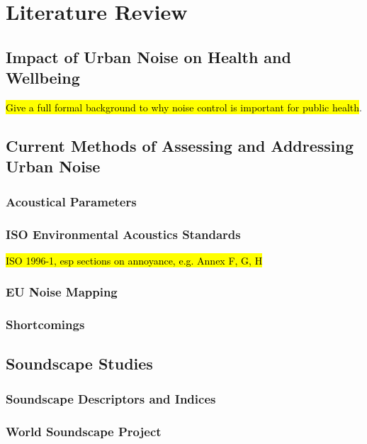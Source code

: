 \chapter{Literature Review}
\label{ch:lit}

\section{Impact of Urban Noise on Health and Wellbeing}

  \hl{Give a full formal background to why noise control is important for public health}.

\section{Current Methods of Assessing and Addressing Urban Noise}

  \subsection{Acoustical Parameters}

  \subsection{ISO Environmental Acoustics Standards}
    \hl{ISO 1996-1, esp sections on annoyance, e.g. Annex F, G, H}

  \subsection{EU Noise Mapping}

  \subsection{Shortcomings}

\section{Soundscape Studies}

  \subsection{Soundscape Descriptors and Indices}

  \subsection{World Soundscape Project}

